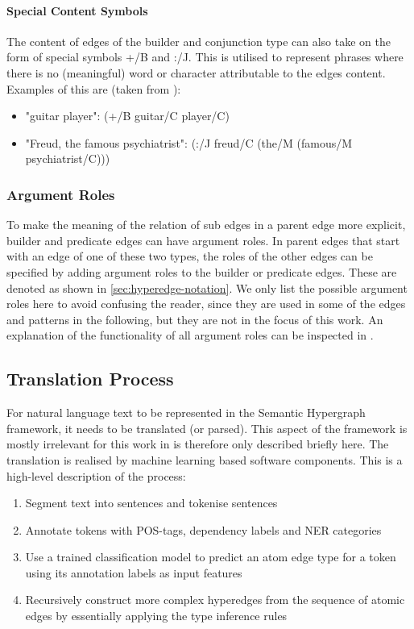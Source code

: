 \documentclass[11pt]{scrreprt}
\let\citef\cite  %
\let\cite\parencite  %
\begin{document}
\paragraph{Special Content Symbols}
\label{sec:special-type-symbols}
The content of edges of the builder and conjunction type can also take on the form of special symbols \textsf{+/B} and \textsf{:/J}. This is utilised to represent phrases where there is no (meaningful) word or character attributable to the edges content. Examples of this are (taken from \citef[p. 7]{menezesSemanticHypergraphs2021}):

\begin{itemize}
	\item "guitar player": \textsf{(+/B guitar/C player/C)}
	\item "Freud, the famous psychiatrist": \textsf{(:/J freud/C (the/M (famous/M psychiatrist/C)))}
\end{itemize}


\subsubsection{Argument Roles}
To make the meaning of the relation of sub edges in a parent edge more explicit, builder and predicate edges can have argument roles. In parent edges that start with an edge of one of these two types, the roles of the other edges can be specified by adding argument roles to the builder or predicate edges. These are denoted as shown in \cref{sec:hyperedge-notation}. We only list the possible argument roles here to avoid confusing the reader, since they are used in some of the edges and patterns in the following, but they are not in the focus of this work. An explanation of the functionality of all argument roles can be inspected in \citef[p. 8]{menezesSemanticHypergraphs2021}.


\subsection{Translation Process}
\label{sec:sh-translation-process}
For natural language text to be represented in the Semantic Hypergraph framework, it needs to be translated (or parsed). This aspect of the framework is mostly irrelevant for this work in is therefore only described briefly here. The translation is realised by machine learning based software components. This is a high-level description of the process: 

\begin{enumerate}
	\item Segment text into sentences and tokenise sentences
	\item Annotate tokens with POS-tags, dependency labels and NER categories
	\item Use a trained classification model to predict an atom edge type for a token using its annotation labels as input features
	\item Recursively construct more complex hyperedges from the sequence of atomic edges by essentially applying the type inference rules
\end{enumerate}
\end{document}
